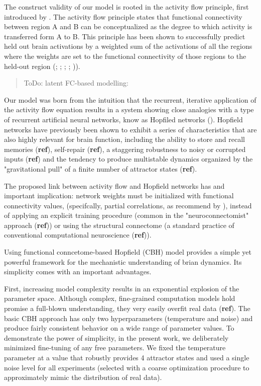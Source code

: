 \documentclass{article}
\begin{document}
The construct validity of our model is rooted in the activity flow principle, first introduced by \href{https://doi.org/10.1038/nn.4406}{}. The activity flow principle states that functional connectivity between region A and B can be conceptualized as the degree to which activity is transferred form A to B. This principle has been shown to successfully predict held out brain activations by a weighted sum of the activations of all the regions where the weights are set to the functional connectivity of those regions to the held-out region (\href{https://doi.org/10.1038/nn.4406}{}; \href{https://doi.org/10.1038/s41467-017-01000-w}{}; \href{https://doi.org/10.1371/journal.pbio.3001686}{}; \href{https://doi.org/10.1126/sciadv.abf2513}{}; \href{https://doi.org/10.1089/brain.2018.0586}{})).

\begin{quote}
ToDo: latent FC-based modelling: \href{https://doi.org/10.1162/netn\_a\_00234}{}
\end{quote}

Our model was born from the intuition that the recurrent, iterative application of the activity flow equation results in a system showing close analogies with a type of recurrent artificial neural networks, know as Hopfiled networks (\href{https://doi.org/10.1073/pnas.79.8.2554}{}).
Hopfield networks have previously been shown to exhibit a series of characteristics that are also highly relevant for brain function, including the ability to store and recall memories (\textbf{ref}), self-repair (\textbf{ref}), a staggering robustness to noisy or corrupted inputs (\textbf{ref}) and the tendency to produce multistable dynamics organized by the "gravitational pull" of a finite number of attractor states (\textbf{ref}).

The proposed link between activity flow and Hopfield networks has and important implication: network weights must be initialized with functional connectivity values, (specifcally, partial correlations, as recommend by \href{https://doi.org/10.1038/nn.4406}{}), instead of applying an explicit training procedure (common in the "neuroconnectomist" approach (\textbf{ref})) or using the structural connectome (a standard practice of conventional computational neuroscience (\textbf{ref})).

Using functional conncetome-based Hopfield (CBH) model provides a simple yet powerful framework for the mechanistic understanding of brian dynamics. Its simplicity comes with an important advantages.

First, increasing model complexity results in an exponential explosion of the parameter space. Although complex, fine-grained computation models hold promise a full-blown understanding, they very easily overfit real data (\textbf{ref}). The basic CBH approach has only two hyperparameters (temperature and noise) and produce fairly consistent behavior on a wide range of parameter values. To demonstrate the power of simplicity, in the present work, we deliberately minimized fine-tuning of any free parameters. We fixed the temperature parameter at a value that robustly provides 4 attractor states and used a single noise level for all experiments (selected with a coarse optimization procedure to approximately mimic the distribution of real data).
\end{document}
